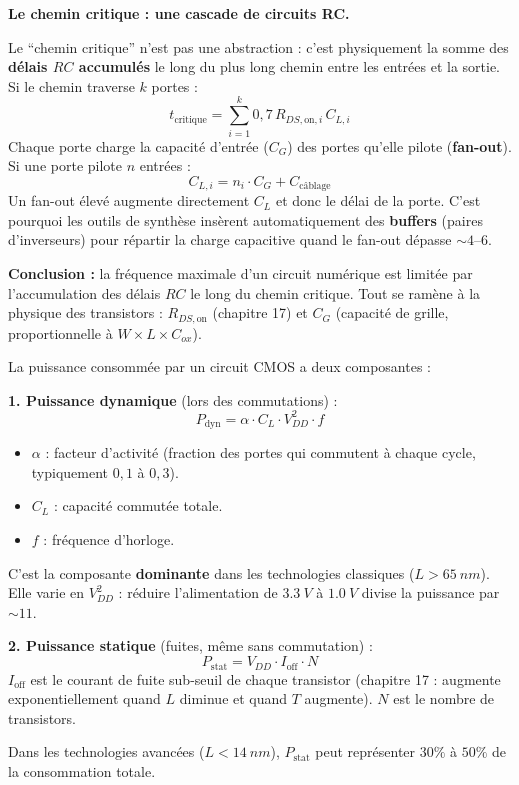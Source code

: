 \documentclass[12pt,a4paper,twoside]{book}
\begin{document}
\begin{formule}
\textbf{Le chemin critique : une cascade de circuits RC.}

Le ``chemin critique'' n'est pas une abstraction : c'est physiquement la somme des \textbf{délais $RC$ accumulés} le long du plus long chemin entre les entrées et la sortie. Si le chemin traverse $k$ portes :
\[
t_{\text{critique}} = \sum_{i=1}^{k} 0{,}7\,R_{DS,\text{on},i}\,C_{L,i}
\]
Chaque porte charge la capacité d'entrée ($C_G$) des portes qu'elle pilote (\textbf{fan-out}). Si une porte pilote $n$ entrées :
\[
C_{L,i} = n_i \cdot C_{G} + C_{\text{câblage}}
\]
Un fan-out élevé augmente directement $C_L$ et donc le délai de la porte. C'est pourquoi les outils de synthèse insèrent automatiquement des \textbf{buffers} (paires d'inverseurs) pour répartir la charge capacitive quand le fan-out dépasse $\sim 4$--$6$.

\textbf{Conclusion :} la fréquence maximale d'un circuit numérique est limitée par l'accumulation des délais $RC$ le long du chemin critique. Tout se ramène à la physique des transistors : $R_{DS,\text{on}}$ (chapitre 17) et $C_G$ (capacité de grille, proportionnelle à $W \times L \times C_{ox}$).
\end{formule}

\begin{formule}
La puissance consommée par un circuit CMOS a deux composantes :

\textbf{1. Puissance dynamique} (lors des commutations) :
\[
\boxed{P_{\text{dyn}} = \alpha \cdot C_L \cdot V_{DD}^2 \cdot f}
\]
\begin{itemize}[nosep]
\item $\alpha$ : facteur d'activité (fraction des portes qui commutent à chaque cycle, typiquement $0{,}1$ à $0{,}3$).
\item $C_L$ : capacité commutée totale.
\item $f$ : fréquence d'horloge.
\end{itemize}
C'est la composante \textbf{dominante} dans les technologies classiques ($L > \SI{65}{nm}$). Elle varie en $V_{DD}^2$ : réduire l'alimentation de $\SI{3.3}{V}$ à $\SI{1.0}{V}$ divise la puissance par $\sim 11$.

\textbf{2. Puissance statique} (fuites, même sans commutation) :
\[
\boxed{P_{\text{stat}} = V_{DD} \cdot I_{\text{off}} \cdot N}
\]
$I_{\text{off}}$ est le courant de fuite sub-seuil de chaque transistor (chapitre 17 : augmente exponentiellement quand $L$ diminue et quand $T$ augmente). $N$ est le nombre de transistors.

Dans les technologies avancées ($L < \SI{14}{nm}$), $P_{\text{stat}}$ peut représenter $30\%$ à $50\%$ de la consommation totale.
\end{formule}
\end{document}
